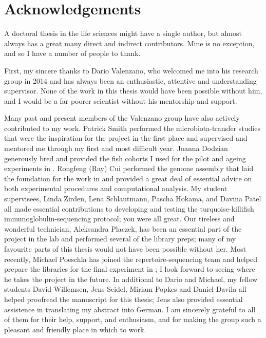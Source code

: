 {
\cleardoublepage
\setsinglecolumn
\chapter*{\centering \LARGE Acknowledgements}
\thispagestyle{empty}

A doctoral thesis in the life sciences might have a single author, but almost always has a great many direct and indirect contributors. Mine is no exception, and so I have a number of people to thank.

First, my sincere thanks to Dario Valenzano, who welcomed me into his research group in 2014 and has always been an enthusiastic, attentive and understanding supervisor. None of the work in this thesis would have been possible without him, and I would be a far poorer scientist without his mentorship and support.

Many past and present members of the Valenzano group have also actively contributed to my work. Patrick Smith performed the microbiota-transfer studies that were the inspiration for the project in the first place and supervised and mentored me through my first and most difficult year. Joanna Dodzian generously bred and provided the fish cohorts I used for the pilot and ageing experiments in . Rongfeng (Ray) Cui performed the genome assembly that laid the foundation for the work in  and provided a great deal of essential advice on both experimental procedures and computational analysis. My student supervisees, Linda Zirden, Lena Schlautmann, Pascha Hokama, and Davina Patel all made essential contributions to developing and testing the turquoise-killifish immunoglobulin-sequencing protocol; you were all great. Our tireless and wonderful technician, Aleksandra Placzek, has been an essential part of the \igseq project in the lab and performed several of the library preps; many of my favourite parts of this thesis would not have been possible without her. Most recently, Michael Poeschla has joined the repertoire-sequencing team and helped prepare the libraries for the final \igseq experiment in ; I look forward to seeing where he takes the project in the future. In additional to Dario and Michael, my fellow students David Willemsen, Jens Seidel, Miriam Popkes and Daniel Davila all helped proofread the manuscript for this thesis; Jens also provided essential assistence in translating my abstract into German. I am sincerely grateful to all of them for their help, support, and enthusiasm, and for making the group such a pleasant and friendly place in which to work.

}
